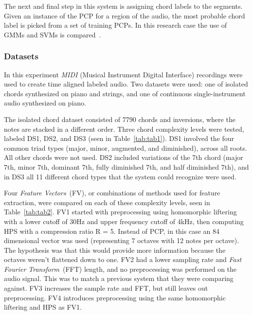 \documentclass{sig-alternate}
\begin{document}

The next and final step in this system is assigning chord labels to the segments. Given an instance of the PCP for a region of the audio, the most probable chord label is picked from a set of training PCPs. In this research case the use of GMMs and SVMs is compared~\cite{Morman:2006}.

\subsubsection{Datasets}

In this experiment \textit{MIDI} (Musical Instrument Digital Interface) recordings were used to create time aligned labeled audio. Two datasets were used: one of isolated chords synthesized on piano and strings, and one of continuous single-instrument audio synthesized on piano. 

The isolated chord dataset consisted of 7790 chords and inversions, where the notes are stacked in a different order. Three chord complexity levels were tested, labeled DS1, DS2, and DS3 (seen in Table~\ref{tab:tab1}). DS1 involved the four common triad types (major, minor, augmented, and diminished), across all roots. All other chords were not used. DS2 included variations of the 7th chord (major 7th, minor 7th, dominant 7th, fully diminished 7th, and half diminished 7th), and in DS3 all 11 different chord types that the system could recognize were used.

Four \textit{Feature Vectors}~(FV), or combinations of methods used for feature extraction, were compared on each of these complexity levels, seen in Table~\ref{tab:tab2}. FV1 started with preprocessing using homomorphic liftering with a lower cutoff of 30Hz and upper frequency cutoff of 4kHz, then computing HPS with a compression ratio R = 5. Instead of PCP, in this case an 84 dimensional vector was used (representing 7 octaves with 12 notes per octave). The hypothesis was that this would provide more information because the octaves weren't flattened down to one. FV2 had a lower sampling rate and \textit{Fast Fourier Transform}~(FFT) length, and no preprocessing was performed on the audio signal. This was to match a previous system that they were comparing against. FV3 increases the sample rate and FFT, but still leaves out preprocessing. FV4 introduces preprocessing using the same homomorphic liftering and HPS as FV1.

\end{document}
